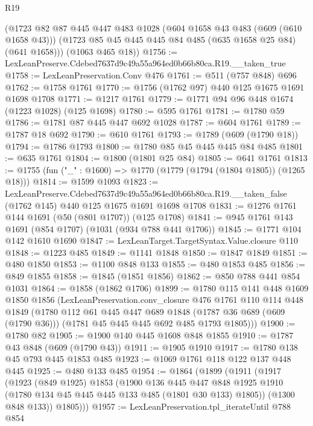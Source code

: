 \begin{lexlean}{R19}
\begin{coremodule}
      (@1723
        @82
        @87
        @445
        @447
        @483
        @1028
        (@604 @1658 @43 @483 (@609 (@610 @1658 @43)))
        (@1723 @85 @45 @445 @445 @84 @485 (@635 @1658 @25 @84) (@641 @1658)))
      (@1063 @465 @18))
@1756 := LexLeanPreserve.Cdebed7637d9c49a55a964ed0b66b80ca.R19.__taken_true
@1758 := LexLeanPreservation.Conv @476
@1761 := @511 (@757 @848) @696
@1762 := @1758 @1761
@1770 := @1756 (@1762 @97) @440 @125 @1675 @1691 @1698 @1708
@1771 := @1217 @1761
@1779 := @1771 @94 @96 @448 @1674 (@1223 @1028) (@125 @1698)
@1780 := @595 @1761
@1781 := @1780 @59
@1786 := @1781 @87 @445 @447 @692 @1028
@1787 := @604 @1761
@1789 := @1787 @18 @692
@1790 := @610 @1761
@1793 := @1789 (@609 (@1790 @18))
@1794 := @1786 @1793
@1800 := @1780 @85 @45 @445 @445 @84 @485
@1801 := @635 @1761
@1804 := @1800 (@1801 @25 @84)
@1805 := @641 @1761
@1813 := @1755 (fun ("_" : @1600) => @1770 (@1779 (@1794 (@1804 @1805)) (@1265 @18)))
@1814 := @1599 @1093
@1823 := LexLeanPreserve.Cdebed7637d9c49a55a964ed0b66b80ca.R19.__taken_false
    (@1762 @145)
    @440
    @125
    @1675
    @1691
    @1698
    @1708
@1831 := @1276 @1761 @144 @1691 (@50 (@801 @1707)) (@125 @1708)
@1841 := @945 @1761 @143 @1691 (@854 @1707) (@1031 (@934 @788 @441 @1706))
@1845 := @1771 @104 @142 @1610 @1690
@1847 := LexLeanTarget.TargetSyntax.Value.closure @110
@1848 := @1223 @485
@1849 := @1141 @1848
@1850 := @1847 @1849
@1851 := @480 @1850
@1853 := @1100 @848 @133
@1855 := @480 @1853 @485
@1856 := @849 @1855
@1858 := @1845 (@1851 @1856)
@1862 := @850 @788 @441 @854 @1031
@1864 := @1858 (@1862 @1706)
@1899 := @1780
    @115
    @141
    @448
    @1609
    @1850
    @1856
    (LexLeanPreservation.conv_closure
      @476
      @1761
      @110
      @114
      @448
      @1849
      (@1780
        @112
        @61
        @445
        @447
        @689
        @1848
        (@1787 @36 @689 (@609 (@1790 @36)))
        (@1781 @45 @445 @445 @692 @485 @1793 @1805)))
@1900 := @1780 @82
@1905 := @1900 @140 @445 @1608 @848 @1855
@1910 := @1787 @43 @848 (@609 (@1790 @43))
@1911 := @1905 @1910
@1917 := @1780 @138 @45 @793 @445 @1853 @485
@1923 := @1069 @1761 @118 @122 @137 @448 @445
@1925 := @480 @133 @485
@1954 := @1864
    (@1899
      (@1911
        (@1917
          (@1923
            (@849 @1925)
            @1853
            (@1900
              @136
              @445
              @447
              @848
              @1925
              @1910
              (@1780 @134 @45 @445 @445 @133 @485 (@1801 @30 @133) @1805))
            (@1300 @848 @133))
          @1805)))
@1957 := LexLeanPreservation.tpl_iterateUntil @788 @854

\end{coremodule}
\end{lexlean}
